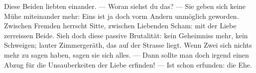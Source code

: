 Diese Beiden liebten einander. — Woran siehst du das? — Sie geben sich keine Mühe miteinander mehr: Eins ist ja doch vorm Andern unmöglich geworden. Zwischen Fremden herrscht Sitte, zwischen Liebenden Scham: mit der Liebe zerreissen Beide. Sieh doch diese passive Brutalität: kein Geheimniss mehr, kein Schweigen; lauter Zimmergeräth, das auf der Strasse liegt. Wenn Zwei sich nichts mehr zu sagen haben, sagen sie sich alles. — Dann sollte man doch irgend einen Abzug für die Unsauberkeiten der Liebe erfinden! — Ist schon erfunden: die Ehe.
\par

